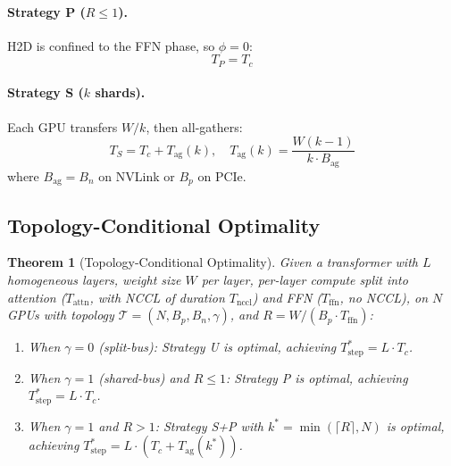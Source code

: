 \documentclass{article}
\newtheorem{theorem}{Theorem}
\begin{document}
\paragraph{Strategy P ($R \leq 1$).} H2D is confined to the FFN phase, so $\phi = 0$:
\begin{equation}
    T_P = T_c
    \label{eq:TP}
\end{equation}

\paragraph{Strategy S ($k$ shards).} Each GPU transfers $W/k$, then all-gathers:
\begin{equation}
    T_S = T_c + T_{\text{ag}}(k), \quad T_{\text{ag}}(k) = \frac{W(k-1)}{k \cdot B_{\text{ag}}}
    \label{eq:TS}
\end{equation}
where $B_{\text{ag}} = B_n$ on NVLink or $B_p$ on PCIe.

\subsection{Topology-Conditional Optimality}

\begin{theorem}[Topology-Conditional Optimality]
\label{thm:main}
Given a transformer with $L$ homogeneous layers, weight size $W$ per layer, per-layer compute split into attention ($T_{\text{attn}}$, with NCCL of duration $T_{\text{nccl}}$) and FFN ($T_{\text{ffn}}$, no NCCL), on $N$ GPUs with topology $\mathcal{T} = (N, B_p, B_n, \gamma)$, and $R = W/(B_p \cdot T_{\text{ffn}})$:

\begin{enumerate}
    \item[\textbf{(i)}] When $\gamma = 0$ (split-bus): Strategy U is optimal, achieving $T_{\text{step}}^* = L \cdot T_c$.
    \item[\textbf{(ii)}] When $\gamma = 1$ (shared-bus) and $R \leq 1$: Strategy P is optimal, achieving $T_{\text{step}}^* = L \cdot T_c$.
    \item[\textbf{(iii)}] When $\gamma = 1$ and $R > 1$: Strategy S+P with $k^* = \min(\lceil R \rceil, N)$ is optimal, achieving $T_{\text{step}}^* = L \cdot (T_c + T_{\text{ag}}(k^*))$.
\end{enumerate}
\end{theorem}
\end{document}
